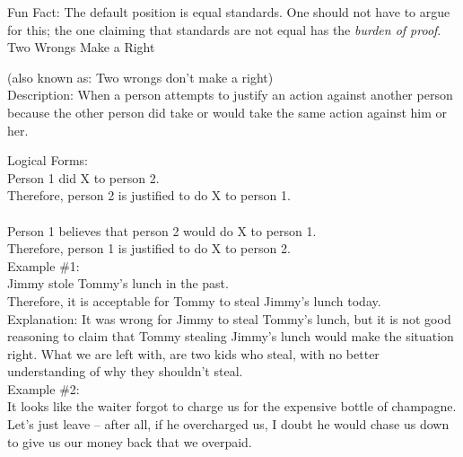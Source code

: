 \documentclass[a4paper,12pt,single,pdftex]{scrbook}
\begin{document}
    
      Fun Fact: The default position is equal standards. One should not have to argue for this; the one claiming that standards are not equal has the {\em burden of proof}.
    \\

  

Two Wrongs Make a Right
    
      (also known as: Two wrongs don't make a right)
    \\

  
    Description: When a person attempts to justify an action against another person because the other person did take or would take the same action against him or her.

    
      Logical Forms:
    \\

    
      Person 1 did X to person 2.
    \\

    
      Therefore, person 2 is justified to do X to person 1.
    \\

    
       
    \\

    
      Person 1 believes that person 2 would do X to person 1.
    \\

    
      Therefore, person 1 is justified to do X to person 2.
    \\

    
      Example \#1:
    \\

    
      Jimmy stole Tommy’s lunch in the past.
    \\

    
      Therefore, it is acceptable for Tommy to steal Jimmy’s lunch today.
    \\

    
      Explanation: It was wrong for Jimmy to steal Tommy’s lunch, but it is not good reasoning to claim that Tommy stealing Jimmy’s lunch would make the situation right.  What we are left with, are two kids who steal, with no better understanding of why they shouldn’t steal.
    \\

    
      Example \#2:
    \\

    
      It looks like the waiter forgot to charge us for the expensive bottle of champagne.  Let’s just leave -- after all, if he overcharged us, I doubt he would chase us down to give us our money back that we overpaid.
    \\
\end{document}
